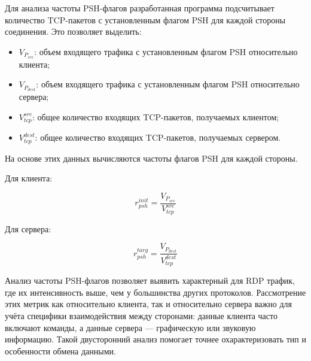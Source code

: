 \documentclass[bachelor, och, coursework]{SCWorks}
\begin{document}


Для анализа частоты PSH-флагов разработанная программа подсчитывает количество TCP-пакетов с установленным флагом PSH для каждой стороны соединения. 
Это позволяет выделить:

\begin{itemize}
  \item $V_{P_{src}}$: объем входящего трафика с установленным флагом PSH относительно клиента;
  \item $V_{P_{dest}}$: объем входящего трафика с установленным флагом PSH относительно сервера;
  \item $V_{tcp}^{src}$: общее количество входящих TCP-пакетов, получаемых клиентом;
  \item $V_{tcp}^{dest}$: общее количество входящих TCP-пакетов, получаемых сервером.
\end{itemize}

На основе этих данных вычисляются частоты флагов PSH для каждой стороны.

Для клиента:

\begin{equation}
  r_{psh}^{init} = \frac{V_{P_{src}}}{V_{tcp}^{src}}
\end{equation}

Для сервера:

\begin{equation}
  r_{psh}^{targ} = \frac{V_{P_{dest}}}{V_{tcp}^{dest}}
\end{equation}

Анализ частоты PSH-флагов позволяет выявить характерный для RDP трафик, где их интенсивность выше, чем у большинства других протоколов. 
Рассмотрение этих метрик как относительно клиента, так и относительно сервера важно для учёта специфики взаимодействия между сторонами: 
данные клиента часто включают команды, а данные сервера — графическую или звуковую информацию. Такой двусторонний анализ помогает точнее 
охарактеризовать тип и особенности обмена данными.
\end{document}
